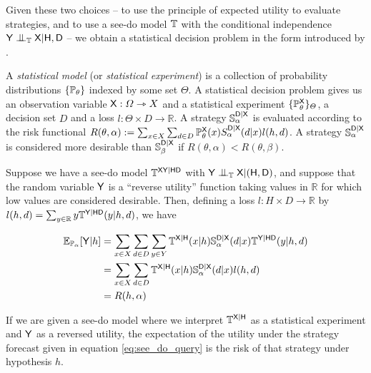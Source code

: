 Given these two choices -- to use the principle of expected utility to evaluate strategies, and to use a see-do model $\mathbb{T}$ with the conditional independence $\RV{Y}\CI_{\model{T}} \RV{X}|\RV{H,D}$ -- we obtain a statistical decision problem in the form introduced by \citet{wald_statistical_1950}.

A \emph{statistical model} (or \emph{statistical experiment}) is a collection of probability distributions $\{\mathbb{P}_\theta\}$ indexed by some set $\Theta$. A statistical decision problem gives us an observation variable $\mathsf{X}:\Omega\rightarrowtriangle X$ and a statistical experiment $\{\mathbb{P}^{\mathsf{X}}_\theta\}_\Theta$, a decision set $D$ and a loss $l:\Theta\times D\to \mathbb{R}$. A strategy $\mathbb{S}^{\mathsf{D}|\mathsf{X}}_\alpha$ is evaluated according to the risk functional $R(\theta,\alpha):=\sum_{x\in X}\sum_{d\in D} \mathbb{P}^{\mathsf{X}}_\theta(x) S^{\mathsf{D}|\mathsf{X}}_\alpha (d|x) l(h,d)$. A strategy $\mathbb{S}^{\mathsf{D}|\mathsf{X}}_\alpha$ is considered more desirable than $\mathbb{S}^{\mathsf{D}|\mathsf{X}}_\beta$ if $R(\theta,\alpha)<R(\theta,\beta)$.

Suppose we have a see-do model $\mathbb{T}^{\mathsf{X}\mathsf{Y}|\mathsf{HD}}$ with $\RV{Y}\CI_{\model{T}} \RV{X}|(\RV{H,D})$, and suppose that the random variable $\mathsf{Y}$ is a ``reverse utility'' function taking values in $\mathbb{R}$ for which low values are considered desirable. Then, defining a loss $l:H\times D\to \mathbb{R}$ by $l(h,d) = \sum_{y\in \mathbb{R}} y\mathbb{T}^{\mathsf{Y}|\mathsf{H}\mathsf{D}}(y|h,d)$, we have 

\begin{align}
    \mathbb{E}_{\mathbb{P}_{\alpha}}[\mathsf{Y}|h] &= \sum_{x\in X} \sum_{d\in D} \sum_{y\in Y} \mathbb{T}^{\mathsf{X}|\mathsf{H}}(x|h) \mathbb{S}_\alpha^{\mathsf{D}|\mathsf{X}}(d|x) \mathbb{T}^{\mathsf{Y}|\mathsf{HD}}(y|h,d)\\
    &= \sum_{x\in X} \sum_{d\in D} \mathbb{T}^{\mathsf{X}|\mathsf{H}}(x|h) \mathbb{S}_\alpha ^{\mathsf{D}|\mathsf{X}}(d|x) l(h,d)\\
    &= R(h,\alpha)
\end{align}

If we are given a see-do model where we interpret $\mathbb{T}^{\mathsf{X}|\mathsf{H}}$ as a statistical experiment and $\mathsf{Y}$ as a reversed utility, the expectation of the utility under the strategy forecast given in equation \ref{eq:see_do_query} is the risk of that strategy under hypothesis $h$.

